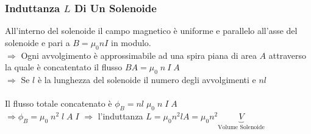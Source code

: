 \documentclass[../main.tex]{subfiles}
\begin{document}
	\subsubsection{Induttanza $L$ Di Un Solenoide}
	All’interno del solenoide il campo magnetico è uniforme e parallelo all’asse del solenoide e pari a $B = \mu_0 n I$ in modulo.\\
	$\Rightarrow$ Ogni avvolgimento è approssimabile ad una spira piana di area $A$ attraverso la quale è concatentato il flusso $BA = \mu_0 \; n \: I \; A$\\
	$\Rightarrow$ Se $l$ è la lunghezza del solenoide il numero degli avvolgimenti e $nl$\\\\
	Il flusso totale concatenato è $\phi_B = nl \; \mu_0 \; n \; I \; A$\\
	$\Rightarrow \phi_B = \mu_0 \; n^2 \; l \; A \; I$ $\Rightarrow$ l'induttanza $L = \mu_0 n^2 l A = \mu_0 n^2 \underbrace{V}_{\text{Volume Solenoide}}$
\end{document}
